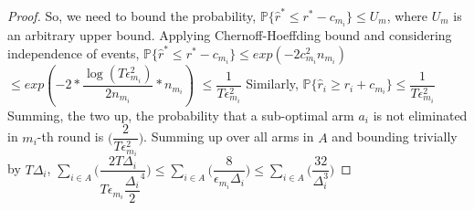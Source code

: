\begin{proof}
	So, we need to bound the probability,
\newline\hspace*{4em} $\mathbb{P}\lbrace\hat{r}^{*}\leq r^{*} - c_{m_{i}}\rbrace\leq U_{m}$, where $U_{m}$ is an  arbitrary upper bound.
\newline
Applying Chernoff-Hoeffding bound and considering independence of events,
\newline
\newline\hspace*{0em} $\mathbb{P}\lbrace\hat{r}^{*}\leq r^{*} - c_{m_{i}}\rbrace\leq exp(-2c_{m_{i}}^{2}n_{m_{i}})$
\newline\hspace*{8em} $\leq exp(-2 * \dfrac{\log (T\epsilon_{m_{i}}^{2})}{2 n_{m_{i}}} *n_{m_{i}})$
\newline\hspace*{8em} $\leq \dfrac{1}{T\epsilon_{m_{i}}^{2}}$
\newline
Similarly, $\mathbb{P}\lbrace\hat{r}_{i}\geq r_{i} + c_{m_{i}}\rbrace\leq \dfrac{1}{T\epsilon_{m_{i}}^{2}}$
\newline
Summing, the two up, the probability that a sub-optimal arm $a_{i}$ is not eliminated in $m_{i}$-th round is  $\bigg(\dfrac{2}{T\epsilon_{m_{i}}^{2}}\bigg)$. 
\newline
Summing up over all arms in $A$ and bounding trivially by $T\Delta_{i}$,
\newline\hspace*{4em} $\sum_{i\in A}\bigg(\dfrac{2T\Delta_{i}}{T\epsilon_{m_{i}}\dfrac{\Delta_{i}}{2}^{4}}\bigg)\leq \sum_{i\in A}\bigg(\dfrac{8}{\epsilon_{m_{i}}\Delta_{i}}\bigg)\leq \sum_{i\in A}\bigg(\dfrac{32}{\Delta_{i}^{3}}\bigg)$



\end{proof}
